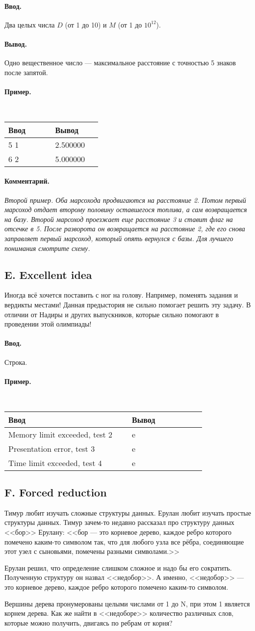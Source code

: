 \documentclass[12pt, a4paper]{article}
\newcommand{\informat}[1]
{
	\paragraph{Ввод.\\} #1
}
\newcommand{\outformat}[1]
{
	\paragraph{Вывод.\\} #1
}
\newcommand{\examplee}[4]
{
	\paragraph{Пример.\\}
	{\tt
	\begin{tabular}{|p{0.4\linewidth}|p{0.4\linewidth}|}
	\hline
	Ввод 	& Вывод  	\\
	\hline
	#1 		& #2 		\\
	\hline
	#3		& #4		\\
	\hline
	\end{tabular}
	}
}
\newcommand{\examplEEE}[6]
{
	\paragraph{Пример.\\}
	{\tt
	\begin{tabular}{|p{0.5\linewidth}|p{0.3\linewidth}|}
	\hline
	Ввод 	& Вывод  	\\
	\hline
	#1 		& #2 		\\
	\hline
	#3		& #4		\\
	\hline
	#5		& #6		\\
	\hline
	\end{tabular}
	}
}
\newcommand{\excomm}[1]
{
	\paragraph{Комментарий. \\}
	\textit{#1}
}
\begin{document}
\informat{Два целых числа $D$ (от 1 до 10) и $M$ (от 1 до $10^{12}$).}

\outformat{Одно вещественное число --- максимальное расстояние с точностью 5 знаков после запятой.}

\examplee{5 1}{2.500000}{6 2}{5.000000}

\excomm{Второй пример. Оба марсохода продвигаются на расстояние 2. Потом первый марсоход отдает второму половину оставшегося топлива, а сам возвращается на базу. Второй марсоход проезжает еще расстояние 3 и ставит флаг на отсечке в 5. После разворота он возвращается на расстояние 2, где его снова заправляет первый марсоход, который опять вернулся с базы. Для лучшего понимания смотрите схему.}





\subsection*{E. Excellent idea}
 


Иногда всё хочется поставить с ног на голову. Например, поменять задания и вердикты местами! Данная предыстория не сильно помогает решить эту задачу. В отличии от Надиры и других выпускников, которые сильно помогают в проведении этой олимпиады!

\informat{Строка.}

\examplEEE{Memory limit exceeded, test 2}{e}{Presentation error, test 3}{e}{Time limit exceeded, test 4}{e}




\subsection*{F. Forced reduction}
 

Тимур любит изучать сложные структуры данных. Ерулан любит изучать простые структуры данных. Тимур зачем-то недавно рассказал про структуру данных <<бор>> Ерулану: <<бор --- это корневое дерево, каждое ребро которого помечено каким-то символом так, что для любого узла все рёбра, соединяющие этот узел с сыновьями, помечены разными символами.>>

Ерулан решил, что определение слишком сложное и надо бы его сократить. Полученную структуру он назвал <<недобор>>. А именно, <<недобор>> --- это корневое дерево, каждое ребро которого помечено каким-то символом.

Вершины дерева пронумерованы целыми числами от 1 до N, при этом 1 является корнем дерева. Как же найти в <<недоборе>> количество различных слов, которые можно получить, двигаясь по ребрам от корня? 
\end{document}
